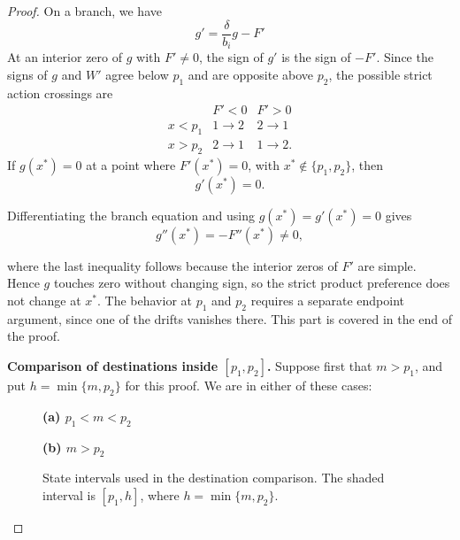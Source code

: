 \documentclass[11pt]{article}
\begin{document}
\begin{proof}
On a branch, we have 
\begin{equation*}
 g'=\frac{\delta}{b_i}g-F'
\end{equation*}
At an interior zero of $g$ with $F'\ne0$, the sign of $g'$ is the sign of
$-F'$. Since the signs of $g$ and $W'$ agree below $p_1$ and are opposite
above $p_2$, the possible strict action crossings are
\begin{equation*}
\begin{array}{c|cc}
 &F'<0&F'>0\\ \hline
 x<p_1&1\to2&2\to1\\
 x>p_2&2\to1&1\to2.
\end{array}
\tag{*}
\end{equation*}
If $g(x^*)=0$ at a point where $F'(x^*)=0$, with
$x^*\notin\{p_1,p_2\}$, then
\begin{equation*}
g'(x^*)=0.
\end{equation*}

Differentiating the branch equation and using $g(x^*)=g'(x^*)=0$ gives
\begin{equation*}
g''(x^*)=-F''(x^*)\neq0,
\end{equation*}

where the last inequality follows because the interior zeros of $F'$ are simple. Hence $g$ touches zero without changing sign, so the strict product preference does not change at $x^*$. The behavior at $p_1$ and $p_2$ requires a separate endpoint argument, since one of the drifts vanishes there. This part is covered in the end of the proof.

\medskip\noindent\textbf{Comparison of destinations inside $[p_1,p_2]$.}
Suppose first that $m>p_1$, and put $h=\min\{m,p_2\}$ for this proof. We are in either of these cases: 

\begin{figure}[htbp]
\centering
\begin{minipage}{0.48\textwidth}
\centering
\textbf{(a) $p_1<m<p_2$}\par\smallskip
{}
\end{minipage}\hfill
\begin{minipage}{0.48\textwidth}
\centering
\textbf{(b) $m>p_2$}\par\smallskip
{}
\end{minipage}
\caption{State intervals used in the destination comparison. The shaded interval is $[p_1,h]$, where $h=\min\{m,p_2\}$.}
\label{fig:destination-comparison-intervals}
\end{figure}


\end{proof}
\end{document}
